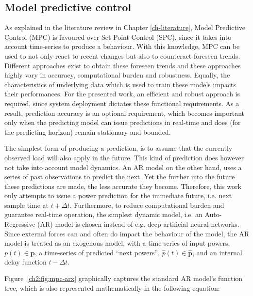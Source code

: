 \subsection{Model predictive control}

As explained in the literature review in Chapter \ref{ch-literature}, Model Predictive Control (MPC) is favoured over Set-Point Control (SPC), since it takes into account time-series to produce a behaviour.
With this knowledge, MPC can be used to not only react to recent changes but also to counteract foreseen trends.
Different approaches exist to obtain these foreseen trends and these approaches highly vary in accuracy, computational burden and robustness.
Equally, the characteristics of underlying data which is used to train these models impacts their performances.
For the presented work, an efficient and robust approach is required, since system deployment dictates these functional requirements.
As a result, prediction accuracy is an optional requirement, which becomes important only when the predicting model can issue predictions in real-time and does (for the predicting horizon) remain stationary and bounded.

The simplest form of producing a prediction, is to assume that the currently observed load will also apply in the future.
This kind of prediction does however not take into account model dynamics.
An AR model on the other hand, uses a series of past observations to predict the next.
Yet the further into the future these predictions are made, the less accurate they become.
Therefore, this work only attempts to issue a power prediction for the immediate future, i.e. next sample time at $t+\Delta t$.
Furthermore, to reduce computational burden and guarantee real-time operation, the simplest dynamic model, i.e. an Auto-Regressive (AR) model is chosen instead of e.g. deep artificial neural networks.
Since external forces can and often do impact the behaviour of the model, the AR model is treated as an exogenous model, with a time-series of input powers, $p(t) \in \textbf{p}$, a time-series of predicted ``next powers'', $\hat{p}(t) \in \hat{\textbf{p}}$, and an internal delay function $t-\Delta t$.



Figure~\ref{ch2:fig:mpc-arx} graphically captures the standard AR model's function tree, which is also represented mathematically in the following equation:



